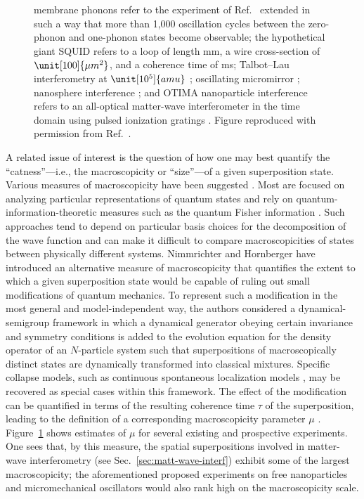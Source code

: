\documentclass[3p,sort&compress,12pt]{elsarticle}
\begin{document}
\begin{figure}
{membrane phonons refer to the experiment of Ref.~\cite{Teufel:2011:oo} extended in such a way that more than 1,000 oscillation cycles between the zero-phonon and one-phonon states become observable;  the hypothetical giant SQUID refers to a loop of length \unit[20]{mm}, a wire cross-section of $\unit[100]{\mu m^2}$, and a coherence time of \unit[1]{ms}; Talbot--Lau interferometry at $\unit[10^5]{amu}$ \cite{Nimmrichter:2011:pr}; oscillating micromirror \cite{Marshall:2003:om}; nanosphere interference \cite{Romero:2011:aa}; and OTIMA nanoparticle interference refers to an all-optical matter-wave interferometer in the time domain using pulsed ionization gratings \cite{Nimmrichter:2011:pr}.  Figure reproduced with permission from Ref.~\cite{Arndt:2014:oo}.}
\label{fig:macro}
\end{figure}

A related issue of interest is the question of how one may best quantify the ``catness''---i.e., the macroscopicity or ``size''---of a given superposition state. Various measures of macroscopicity have been suggested \cite{Leggett:1980:yt,Leggett:2002:uy,Dur:2002:pp,Bjork:2004:pp,Korsbakken:2007:pp,Marquardt:2008:ii,Lee:2011:oo,Frowis:2012:zz,Nimmrichter:2013:aa}. Most are focused on analyzing particular representations of quantum states and rely on quantum-information-theoretic measures such as the quantum Fisher information \cite{Frowis:2012:zz}. Such approaches tend to depend on particular basis choices for the decomposition of the wave function and can make it difficult to compare macroscopicities of states between physically different systems. Nimmrichter and Hornberger \cite{Nimmrichter:2013:aa} have introduced an alternative measure of macroscopicity that quantifies the extent to which a given superposition state would be capable of ruling out small modifications of quantum mechanics. To represent such a modification in the most general and model-independent way, the authors considered a dynamical-semigroup framework in which a dynamical generator obeying certain invariance and symmetry conditions is added to the evolution equation for the density operator of an $N$-particle system such that superpositions of macroscopically distinct states are dynamically transformed into classical mixtures. Specific collapse models, such as continuous spontaneous localization models \cite{Bassi:2003:yb}, may be recovered as special cases within this framework. The effect of the modification can be quantified in terms of the resulting coherence time $\tau$ of the superposition, leading to the definition of a corresponding macroscopicity parameter $\mu$ \cite{Nimmrichter:2013:aa}. Figure~\ref{fig:macro} shows estimates of $\mu$ for several existing and prospective experiments. One sees that, by this measure, the spatial superpositions involved in matter-wave interferometry  (see Sec.~\ref{sec:matt-wave-interf}) exhibit some of the largest macroscopicity; the aforementioned proposed experiments on free nanoparticles \cite{Romero:2011:aa,Wan:2016:oo} and micromechanical oscillators \cite{Marshall:2003:om,Pikovski:2012:aa} would also rank high on the macroscopicity scale. 
\end{document}

